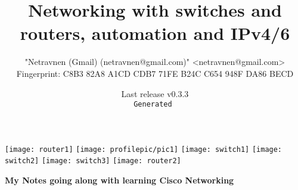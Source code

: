 
\title{Networking with switches and routers, automation and IPv4/6}
\def\thesubject{My Notes going along with learning Cisco Networking}

\author{"Netravnen (Gmail) (netravnen@gmail.com)" <netravnen@gmail.com>\\
    Fingerprint: C8B3 82A8 A1CD CDB7 71FE  B24C C654 948F DA86 BECD}

\def\theversion{v0.3.3}
\date{{\footnotesize Last release \theversion\\%
    \texttt{\color{Gray}Generated \utccurrenttime}}}

\begin{titlepage}
    \centering
    \texttt{[image: router1]}
    \texttt{[image: profilepic/pic1]}
    \texttt{[image: switch1]}
    \texttt{[image: switch2]}
    \texttt{[image: switch3]}
    \texttt{[image: router2]}\par\vspace{1cm}
    {\scshape\Large \thetitle\par}
    \vspace{1.5cm}
    {\huge\bfseries \thesubject\par}
    \vspace{2cm}
    {\Large\itshape \theauthor\par}
    
    \vfill
    
    {\large \thedate\par}
\end{titlepage}
